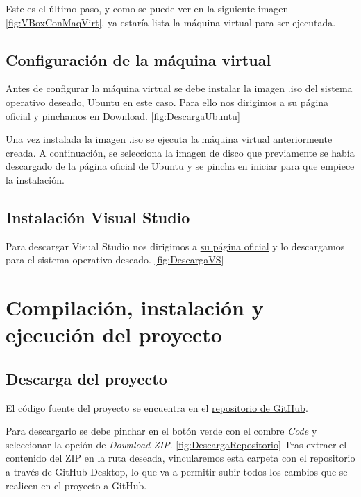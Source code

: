 Este es el último paso, y como se puede ver en la siguiente imagen \ref{fig:VBoxConMaqVirt}, ya estaría lista la máquina virtual para ser ejecutada.


\subsection{Configuración de la máquina virtual}
Antes de configurar la máquina virtual se debe instalar la imagen .iso del sistema operativo deseado, Ubuntu en este caso. Para ello nos dirigimos a \href{https://ubuntu.com/download/desktop}{su página oficial} y pinchamos en Download. \ref{fig:DescargaUbuntu}


Una vez instalada la imagen .iso se ejecuta la máquina virtual anteriormente creada. A continuación, se selecciona la imagen de disco que previamente se había descargado de la página oficial de Ubuntu y se pincha en iniciar para que empiece la instalación.

\subsection{Instalación Visual Studio}
Para descargar Visual Studio nos dirigimos a \href{https://code.visualstudio.com/download}{su página oficial} y lo descargamos para el sistema operativo deseado. \ref{fig:DescargaVS}



\section{Compilación, instalación y ejecución del proyecto}

\subsection{Descarga del proyecto}
El código fuente del proyecto se encuentra en el \href{https://github.com/eca1001/TFG}{repositorio de GitHub}.

Para descargarlo se debe pinchar en el botón verde con el combre \textit{Code} y seleccionar la opción de \textit{Download ZIP}. \ref{fig:DescargaRepositorio} Tras extraer el contenido del ZIP en la ruta deseada, vincularemos esta carpeta con el repositorio a través de GitHub Desktop, lo que va a permitir subir todos los cambios que se realicen en el proyecto a GitHub. 


